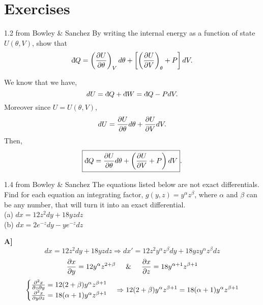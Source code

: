     \section{Exercises}
        \begin{eocproblem*}{1.2 from Bowley \& Sanchez}
            By writing the internal energy as a function of state $U(\theta,V)$, show that 
            \begin{equation}
                \text{d}\hspace*{-0.13em}\bar{}\hspace*{0.1em} Q = \left( \frac{\partial U}{\partial \theta} \right)_Vd\theta+\left[ \left( \frac{\partial U}{\partial V} \right)_\theta+P \right]dV.
            \end{equation}
        \end{eocproblem*}
        \noindent We know that we have, 
        \begin{equation}
            dU = \text{d}\hspace*{-0.13em}\bar{}\hspace*{0.1em} Q + \text{d}\hspace*{-0.13em}\bar{}\hspace*{0.1em} W = \text{d}\hspace*{-0.13em}\bar{}\hspace*{0.1em} Q -PdV.
        \end{equation}
        Moreover since $U=U(\theta,V)$,
        \begin{equation}
            dU = \frac{\partial U}{\partial \theta}d\theta + \frac{\partial U}{\partial V}dV.
        \end{equation}
        Then,
        \begin{equation}
            \boxed{\text{d}\hspace*{-0.13em}\bar{}\hspace*{0.1em} Q = \frac{\partial U}{\partial \theta}d\theta + \left( \frac{\partial U}{\partial V}+P \right)dV}.
        \end{equation}
\newpage
        \begin{eocproblem*}{1.4 from Bowley \& Sanchez}
            The equations listed below are not exact differentials. Find for each equation an integrating factor, $g(y,z) = y^\alpha z^\beta$, where $\alpha$ and $\beta$ can be any number, that will turn it into an exact differential.\\
            (a) $dx = 12z^2dy+18yzdz$\\
            (b) $dx = 2e^{-z}dy-ye^{-z}dz$
        \end{eocproblem*}
        \textbf{A]} 
        \begin{equation}
            dx = 12z^2dy + 18yzdz \Rightarrow  dx' = 12z^2y^\alpha z^\beta dy + 18yzy^\alpha z^\beta dz
        \end{equation}
        \begin{equation}
            \frac{\partial x}{\partial y} = 12y^\alpha z^{2+\beta} \hspace{0.5cm} \& \hspace{0.5cm} \frac{\partial x}{\partial z} = 18y^{\alpha+1}z^{\beta+1}
        \end{equation}
        \begin{equation}
            \begin{cases}
                \frac{\partial ^2x}{\partial z\partial y} = 12(2+\beta)y^\alpha z^{\beta+1} \\ 
                \frac{\partial ^2x}{\partial y\partial z} = 18(\alpha + 1)y^\alpha z^{\beta+1}
            \end{cases} \Rightarrow 12(2+\beta)y^\alpha z^{\beta+1} = 18(\alpha+1)y^\alpha z^{\beta+1}
        \end{equation}
